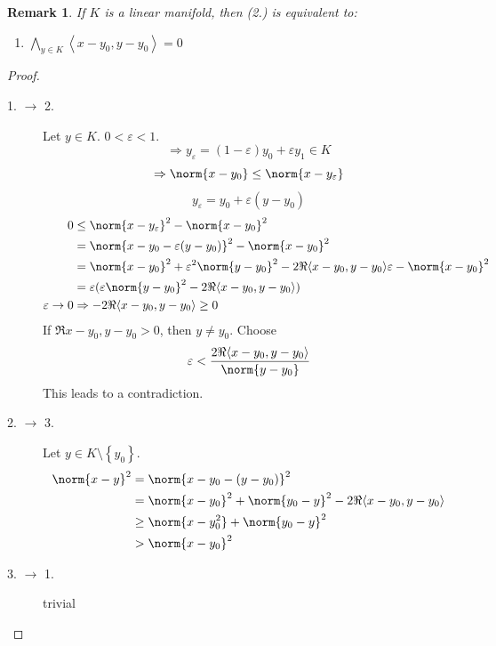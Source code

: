\documentclass[a4paper,landscape,twocolumn]{article}
\newcommand\set[1]{\left\{#1\right\}}
\newcommand\functional[1]{\left\langle{#1}\right\rangle}
\newtheorem{rem}{Remark}
\DeclarePairedDelimiter\norm\lVert\rVert
\begin{document}
\begin{rem}
  If $K$ is a linear manifold, then (2.) is equivalent to:
  \begin{enumerate}
    \item[2'.] $\bigwedge_{y \in K} \functional{x - y_0, y - y_0} = 0$
  \end{enumerate}
\end{rem}

\begin{proof}
  \begin{description}
    \item[1. $\rightarrow$ 2.]
      Let $y \in K$. $0 < \varepsilon < 1$.
      \[ \Rightarrow y_\varepsilon = (1 - \varepsilon) y_0 + \varepsilon y_1 \in K \]
      \[ \Rightarrow \norm{x - y_0} \leq \norm{x - y_\varepsilon} \]
      \[ y_\varepsilon = y_0 + \varepsilon (y - y_0) \]
      \begin{align*}
        0 &\leq \norm{x - y_\varepsilon}^2 - \norm{x - y_0}^2 \\
          &= \norm{x - y_0 - \varepsilon (y - y_0)}^2 - \norm{x - y_0}^2 \\
          &= \norm{x - y_0}^2 + \varepsilon^2 \norm{y - y_0}^2 - 2 \Re{\functional{x - y_0, y - y_0}} \varepsilon - \norm{x - y_0}^2 \\
          &= \varepsilon(\varepsilon \norm{y - y_0}^2 - 2 \Re{\functional{x - y_0, y - y_0}}) \\
        \varepsilon \to 0 & \Rightarrow -2 \Re{\functional{x - y_0, y - y_0}} \geq 0
      \end{align*}
      If $\Re{x - y_0, y - y_0} > 0$, then $y \neq y_0$. Choose
      \[ \varepsilon < \frac{2\Re{\functional{x - y_0, y - y_0}}}{\norm{y - y_0}} \]
      This leads to a contradiction.
    \item[2. $\rightarrow$ 3.]
      Let $y \in K \setminus \set{y_0}$.
      \begin{align*}
        \norm{x - y}^2 &= \norm{x - y_0 - (y - y_0)}^2 \\
          &= \norm{x - y_0}^2 + \norm{y_0 - y}^2 - 2 \Re{\functional{x - y_0, y - y_0}} \\
          &\geq \norm{x - y_0^2} + \norm{y_0 - y}^2 \\
          &> \norm{x - y_0}^2
      \end{align*}
    \item[3. $\rightarrow$ 1.]
      trivial
  \end{description}


\end{proof}
\end{document}
